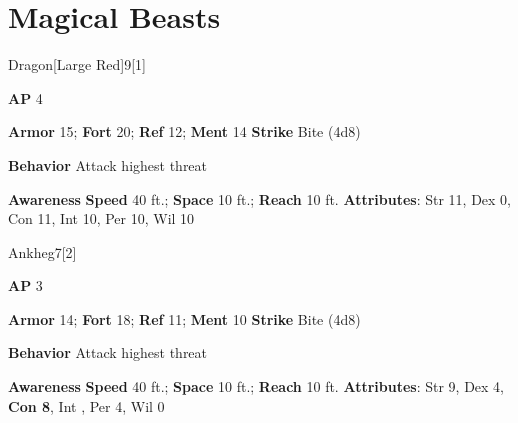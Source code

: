 \section{Magical Beasts}
\begin{monsection}{Dragon}[Large Red]{9}[1]
\vspace{-1em}\vspace{-1em}
\begin{spellcontent}
\begin{spelltargetinginfo}
{\textbf{AP} 4}

\pari \textbf{Armor} 15;
\textbf{Fort} 20;
\textbf{Ref} 12;
\textbf{Ment} 14
\pari \textbf{Strike} Bite  (4d8)



\pari \textbf{Behavior} Attack highest threat
\end{spelltargetinginfo}
\end{spellcontent}

\begin{monsterfooter}
\pari \textbf{Awareness} 
\pari \textbf{Speed} 40 ft.;
\textbf{Space} 10 ft.;
\textbf{Reach} 10 ft.
\pari \textbf{Attributes}:
Str 11,
Dex 0,
Con 11,
Int 10,
Per 10,
Wil 10
\end{monsterfooter}
\end{monsection}

\begin{monsection}{Ankheg}{7}[2]
\vspace{-1em}\vspace{-1em}
\begin{spellcontent}
\begin{spelltargetinginfo}
{\textbf{AP} 3}

\pari \textbf{Armor} 14;
\textbf{Fort} 18;
\textbf{Ref} 11;
\textbf{Ment} 10
\pari \textbf{Strike} Bite  (4d8)



\pari \textbf{Behavior} Attack highest threat
\end{spelltargetinginfo}
\end{spellcontent}

\begin{monsterfooter}
\pari \textbf{Awareness} 
\pari \textbf{Speed} 40 ft.;
\textbf{Space} 10 ft.;
\textbf{Reach} 10 ft.
\pari \textbf{Attributes}:
Str 9,
Dex 4,
\textbf{Con 8},
Int ,
Per 4,
Wil 0
\end{monsterfooter}
\end{monsection}


